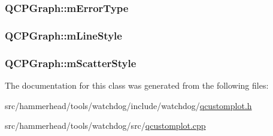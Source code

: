 \subsubsection[{\texorpdfstring{m\+Error\+Type}{mErrorType}}]{ Q\+C\+P\+Graph\+::m\+Error\+Type\hspace{0.3cm}{\ttfamily [protected]}}\hypertarget{classQCPGraph_a29e64273db201aeadebc61c870720a36}{}\label{classQCPGraph_a29e64273db201aeadebc61c870720a36}
\subsubsection[{\texorpdfstring{m\+Line\+Style}{mLineStyle}}]{ Q\+C\+P\+Graph\+::m\+Line\+Style\hspace{0.3cm}{\ttfamily [protected]}}\hypertarget{classQCPGraph_a8604fd98402035a63375849f7341ee25}{}\label{classQCPGraph_a8604fd98402035a63375849f7341ee25}
\subsubsection[{\texorpdfstring{m\+Scatter\+Style}{mScatterStyle}}]{ Q\+C\+P\+Graph\+::m\+Scatter\+Style\hspace{0.3cm}{\ttfamily [protected]}}\hypertarget{classQCPGraph_a4aa36241f166ccd1f75fc8f24e4a3247}{}\label{classQCPGraph_a4aa36241f166ccd1f75fc8f24e4a3247}


The documentation for this class was generated from the following files\+:\begin{DoxyCompactItemize}
\item 
src/hammerhead/tools/watchdog/include/watchdog/\hyperlink{qcustomplot_8h}{qcustomplot.\+h}\item 
src/hammerhead/tools/watchdog/src/\hyperlink{qcustomplot_8cpp}{qcustomplot.\+cpp}\end{DoxyCompactItemize}

